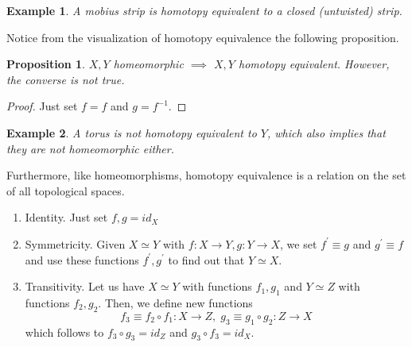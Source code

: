 \documentclass{article}
\newtheorem{proposition}[theorem]{Proposition}
\newtheorem{example}{Example}[section]
\theoremstyle{remark}
\theoremstyle{definition}
\begin{document}
    \begin{example}
    A mobius strip is homotopy equivalent to a closed (untwisted) strip. 
    \end{example}

    Notice from the visualization of homotopy equivalence the following proposition. 

    \begin{proposition}
    $X, Y$ homeomorphic $\implies$ $X, Y$ homotopy equivalent. However, the converse is not true. 
    \end{proposition}
    \begin{proof}
    Just set $f = f$ and $g = f^{-1}$. 
    \end{proof}

    \begin{example}
    A torus is not homotopy equivalent to $Y$, which also implies that they are not homeomorphic either. 
    \begin{center}
    \end{center}
    \end{example}

    Furthermore, like homeomorphisms, homotopy equivalence is a relation on the set of all topological spaces. 
    \begin{enumerate}
        \item Identity. Just set $f, g = id_X$
        \item Symmetricity. Given $X \simeq Y$ with $f: X \longrightarrow Y, g: Y \longrightarrow X$, we set $f^\prime \equiv g$ and $g^\prime \equiv f$ and use these functions $f^\prime, g^\prime$ to find out that $Y \simeq X$. 
        \item Transitivity. Let us have $X \simeq Y$ with functions $f_1, g_1$ and $Y \simeq Z$ with functions $f_2, g_2$. Then, we define new functions 
        \[f_3 \equiv f_2 \circ f_1: X \longrightarrow Z, \; g_3 \equiv g_1 \circ g_2: Z \longrightarrow X\]
        which follows to $f_3 \circ g_3 = id_Z$ and $g_3 \circ f_3 = id_X$. 
    \end{enumerate}
\end{document}
